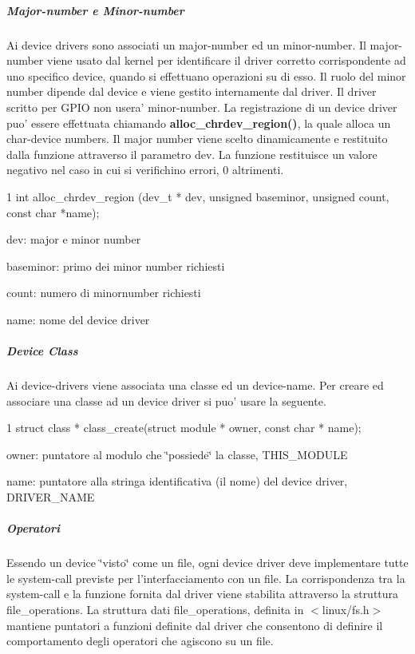 \subparagraph*{Major-\/number e Minor-\/number}

Ai device drivers sono associati un major-\/number ed un minor-\/number. Il major-\/number viene usato dal kernel per identificare il driver corretto corrispondente ad uno specifico device, quando si effettuano operazioni su di esso. Il ruolo del minor number dipende dal device e viene gestito internamente dal driver. Il driver scritto per G\+P\+I\+O non usera' minor-\/number. La registrazione di un device driver puo' essere effettuata chiamando {\bfseries alloc\+\_\+chrdev\+\_\+region()}, la quale alloca un char-\/device numbers. Il major number viene scelto dinamicamente e restituito dalla funzione attraverso il parametro dev. La funzione restituisce un valore negativo nel caso in cui si verifichino errori, 0 altrimenti. 
\begin{DoxyCode}
1 int alloc\_chrdev\_region (dev\_t * dev, unsigned baseminor, unsigned count, const char *name);
\end{DoxyCode}

\begin{DoxyItemize}
\item dev\+: major e minor number
\item baseminor\+: primo dei minor number richiesti
\item count\+: numero di minornumber richiesti
\item name\+: nome del device driver
\end{DoxyItemize}

\subparagraph*{Device Class}

Ai device-\/drivers viene associata una classe ed un device-\/name. Per creare ed associare una classe ad un device driver si puo' usare la seguente. 
\begin{DoxyCode}
1 struct class * class\_create(struct module * owner, const char * name);
\end{DoxyCode}

\begin{DoxyItemize}
\item owner\+: puntatore al modulo che \char`\"{}possiede\char`\"{} la classe, T\+H\+I\+S\+\_\+\+M\+O\+D\+U\+L\+E
\item name\+: puntatore alla stringa identificativa (il nome) del device driver, D\+R\+I\+V\+E\+R\+\_\+\+N\+A\+M\+E
\end{DoxyItemize}

\subparagraph*{Operatori}

Essendo un device \char`\"{}visto\char`\"{} come un file, ogni device driver deve implementare tutte le system-\/call previste per l'interfacciamento con un file. La corrispondenza tra la system-\/call e la funzione fornita dal driver viene stabilita attraverso la struttura file\+\_\+operations. La struttura dati file\+\_\+operations, definita in $<$linux/fs.\+h$>$ mantiene puntatori a funzioni definite dal driver che consentono di definire il comportamento degli operatori che agiscono su un file.



